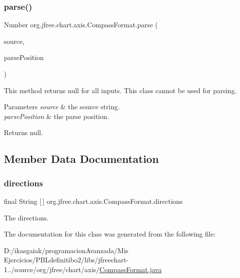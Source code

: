 \subsubsection{\texorpdfstring{parse()}{parse()}}
{\footnotesize\ttfamily Number org.\+jfree.\+chart.\+axis.\+Compass\+Format.\+parse (\begin{DoxyParamCaption}\item[{String}]{source,  }\item[{Parse\+Position}]{parse\+Position }\end{DoxyParamCaption})}

This method returns {\ttfamily null} for all inputs. This class cannot be used for parsing.


\begin{DoxyParams}{Parameters}
{\em source} & the source string. \\
\hline
{\em parse\+Position} & the parse position.\\
\hline
\end{DoxyParams}
\begin{DoxyReturn}{Returns}
{\ttfamily null}. 
\end{DoxyReturn}


\subsection{Member Data Documentation}
\mbox{\label{classorg_1_1jfree_1_1chart_1_1axis_1_1_compass_format_ae47ec4d6a4e761fc13ad334781d36f73}} 
\subsubsection{\texorpdfstring{directions}{directions}}
{\footnotesize\ttfamily final String \mbox{[}$\,$\mbox{]} org.\+jfree.\+chart.\+axis.\+Compass\+Format.\+directions}

The directions. 

The documentation for this class was generated from the following file\+:\begin{DoxyCompactItemize}
\item 
D\+:/ikasgaiak/programacion\+Avanzada/\+Mis Ejercicios/\+P\+B\+Ldefinitibo2/libs/jfreechart-\/1../source/org/jfree/chart/axis/\mbox{\hyperlink{_compass_format_8java}{Compass\+Format.\+java}}\end{DoxyCompactItemize}
